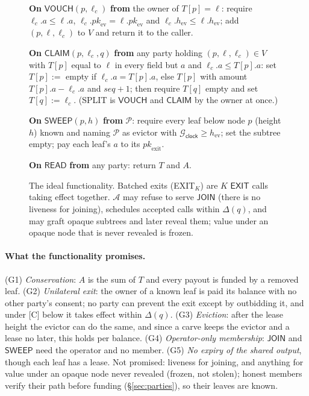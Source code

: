 \documentclass[runningheads]{llncs}
\newcommand{\tr}[1]{\textsf{#1}}
\newcommand{\Gclock}{\ensuremath{\mathcal{G}_{\mathsf{clock}}}}
\newcommand{\Adv}{\ensuremath{\mathcal{A}}}
\newcommand{\iface}[1]{\ensuremath{\mathsf{#1}}}
\newcommand{\lat}{\ensuremath{\Delta}}
\begin{document}
\begin{figure}[tbp]
{{\textbf{On} $\iface{VOUCH}(p, \ell_c)$ \textbf{from} the owner of $T[p] = \ell$: require $\ell_c.a \le \ell.a$, $\ell_c.\mathit{pk}_{\mathrm{ev}} = \ell.\mathit{pk}_{\mathrm{ev}}$ and $\ell_c.h_{\mathrm{ev}} \le \ell.h_{\mathrm{ev}}$; add $(p, \ell, \ell_c)$ to $V$ and return it to the caller.\par
\textbf{On} $\iface{CLAIM}(p, \ell_c, q)$ \textbf{from} any party holding $(p, \ell, \ell_c) \in V$ with $T[p]$ equal to $\ell$ in every field but $a$ and $\ell_c.a \le T[p].a$: set $T[p] :=$ empty if $\ell_c.a = T[p].a$, else $T[p]$ with amount $T[p].a - \ell_c.a$ and $\mathit{seq}+1$; then require $T[q]$ empty and set $T[q] := \ell_c$. (\tr{SPLIT} is \iface{VOUCH} and \iface{CLAIM} by the owner at once.)\par
\textbf{On} $\iface{SWEEP}(p, h)$ \textbf{from} $\mathcal{P}$: require every leaf below node $p$ (height $h$) known and naming $\mathcal{P}$ as evictor with $\Gclock \ge h_{\mathrm{ev}}$; set the subtree empty; pay each leaf's $a$ to its $\mathit{pk}_{\mathrm{exit}}$.\par
\textbf{On} $\iface{READ}$ \textbf{from} any party: return $T$ and $A$.
}}
\caption{The ideal functionality. Batched exits (\tr{EXIT}$_K$) are $K$ \iface{EXIT} calls taking effect together. \Adv{} may refuse to serve \iface{JOIN} (there is no liveness for joining), schedules accepted calls within $\lat(q)$, and may graft opaque subtrees and later reveal them; value under an opaque node that is never revealed is frozen.}
\label{fig:func}
\end{figure}

\paragraph{What the functionality promises.} (G1) \emph{Conservation}:
$A$ is the sum of $T$ and every payout is funded by a removed leaf.
(G2) \emph{Unilateral exit}: the owner of a known leaf is paid its
balance with no other party's consent; no party can prevent the exit
except by outbidding it, and under [C] below it takes effect within
$\lat(q)$. (G3) \emph{Eviction}: after the lease height the evictor can
do the same, and since a carve keeps the evictor and a lease no later,
this holds per balance. (G4) \emph{Operator-only membership}:
\iface{JOIN} and \iface{SWEEP} need the operator and no member. (G5)
\emph{No expiry of the shared output}, though each leaf has a lease.
Not promised: liveness for joining, and anything for value under an
opaque node never revealed (frozen, not stolen); honest members verify
their path before funding (\S\ref{sec:parties}), so their leaves are
known.
\end{document}

